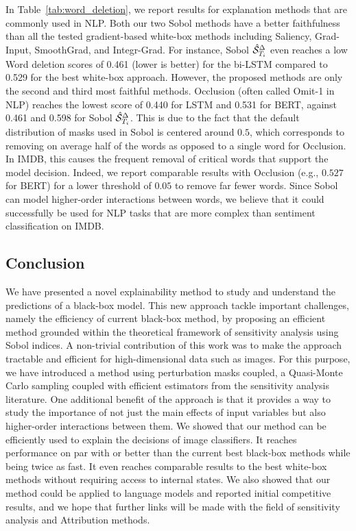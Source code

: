 In Table~\ref{tab:word_deletion}, we report results for explanation methods that are commonly used in NLP.
Both our two Sobol methods have a better faithfulness than all the tested gradient-based white-box methods including Saliency, Grad-Input, SmoothGrad, and Integr-Grad. For instance, Sobol $\hat{\mathcal{S}}^{\Delta}_{T_i}$ even reaches a low Word deletion scores of 0.461 (lower is better) for the bi-LSTM compared to 0.529 for the best white-box approach.
However, the proposed methods are only the second and third most faithful methods. Occlusion (often called Omit-1 in NLP) reaches the lowest score of 0.440 for LSTM and 0.531 for BERT, against 0.461 and 0.598 for Sobol $\hat{\mathcal{S}}^{\Delta}_{T_i}$. This is due to the fact that the default distribution of masks used in Sobol is centered around $0.5$, which corresponds to removing on average half of the words as opposed to a single word for Occlusion.
In IMDB, this causes the frequent removal of critical words that support the model decision.
Indeed, we report comparable results with Occlusion (e.g., $0.527$ for BERT) for a lower threshold of $0.05$ to remove far fewer words. Since Sobol can model higher-order interactions between words, we believe that it could successfully be used for NLP tasks that are more complex than sentiment classification on IMDB.

\subsection{Conclusion}

We have presented a novel explainability method to study and understand the predictions of a black-box model. This new approach tackle important challenges, namely the efficiency of current black-box method, by proposing an efficient method grounded within the theoretical framework of sensitivity analysis using Sobol indices.
A non-trivial contribution of this work  was to make the approach tractable and efficient for high-dimensional data such as images. For this purpose, we have introduced a method using perturbation masks coupled, a Quasi-Monte Carlo sampling coupled with efficient estimators from the sensitivity analysis literature. One additional benefit of the approach is that it provides a way to study the importance of not just the main effects of input variables but also higher-order interactions between them.
We showed that our method can be efficiently used to explain the decisions of image classifiers.
It reaches performance on par with or better than the current best black-box methods while being twice as fast. It even reaches comparable results to the best white-box methods without requiring access to internal states.
We also showed that our method could be applied to language models and reported initial competitive results, and we hope that further links will be made with the field of sensitivity analysis and Attribution methods.
